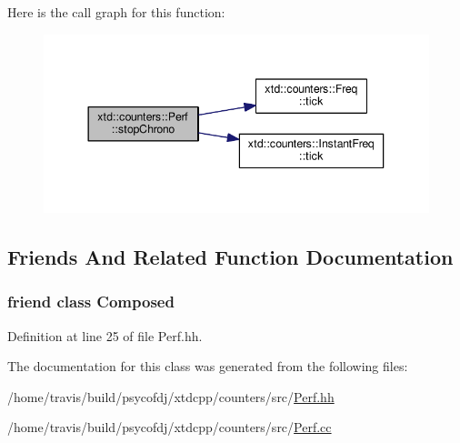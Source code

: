 Here is the call graph for this function\-:
\nopagebreak
\begin{figure}[H]
\begin{center}
\leavevmode
\includegraphics[width=344pt]{classxtd_1_1counters_1_1Perf_a905d73c1604d74e28bb56ea2bb4867ef_cgraph}
\end{center}
\end{figure}




\subsection{Friends And Related Function Documentation}
\hypertarget{classxtd_1_1counters_1_1Perf_a93e934ad70d5b32b14beed5572450abf}{
\subsubsection[{Composed}]{\setlength{\rightskip}{0pt plus 5cm}friend class {\bf Composed}\hspace{0.3cm}{\ttfamily [friend]}}}\label{classxtd_1_1counters_1_1Perf_a93e934ad70d5b32b14beed5572450abf}


Definition at line 25 of file Perf.\-hh.



The documentation for this class was generated from the following files\-:\begin{DoxyCompactItemize}
\item 
/home/travis/build/psycofdj/xtdcpp/counters/src/\hyperlink{Perf_8hh}{Perf.\-hh}\item 
/home/travis/build/psycofdj/xtdcpp/counters/src/\hyperlink{Perf_8cc}{Perf.\-cc}\end{DoxyCompactItemize}
